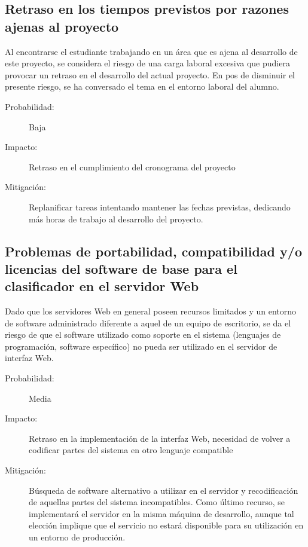 \documentclass[12pt,bibliography=oldstyle,DIV=14,parskip=full-,titlepage]{scrartcl}
\begin{document}
\subsection{Retraso en los tiempos previstos por razones ajenas al proyecto}
Al encontrarse el estudiante trabajando en un área que es ajena al
desarrollo de este proyecto, se considera el riesgo de una carga
laboral excesiva que pudiera provocar un retraso en el desarrollo del
actual proyecto. En pos de disminuir el presente riesgo, se ha
conversado el tema en el entorno laboral del alumno.
\begin{description}
  \item[Probabilidad:] Baja
  \item[Impacto:] Retraso en el cumplimiento del cronograma del
    proyecto
  \item[Mitigación:] Replanificar tareas intentando mantener las
    fechas previstas, dedicando más horas de trabajo al desarrollo del
    proyecto.
\end{description}
%
\subsection{Problemas de portabilidad, compatibilidad y/o
  licencias del software de base para el clasificador en el servidor Web}
Dado que los servidores Web en general poseen recursos limitados y un
entorno de software administrado diferente a aquel de un equipo de
escritorio, se da el riesgo de que el software utilizado como soporte
en el sistema (lenguajes de programación, software específico) no
pueda ser utilizado en el servidor de interfaz Web.
\begin{description}
  \item[Probabilidad:] Media
  \item[Impacto:] Retraso en la implementación de la interfaz Web,
    necesidad de volver a codificar partes del sistema en otro
    lenguaje compatible
  \item[Mitigación:] Búsqueda de software alternativo a utilizar en el
    servidor y recodificación de aquellas partes del sistema
    incompatibles. Como último recurso, se implementará el servidor en
    la misma máquina de desarrollo, aunque tal elección implique que
    el servicio no estará disponible para su utilización en un entorno
    de producción.
\end{description}
%
%
\end{document}
